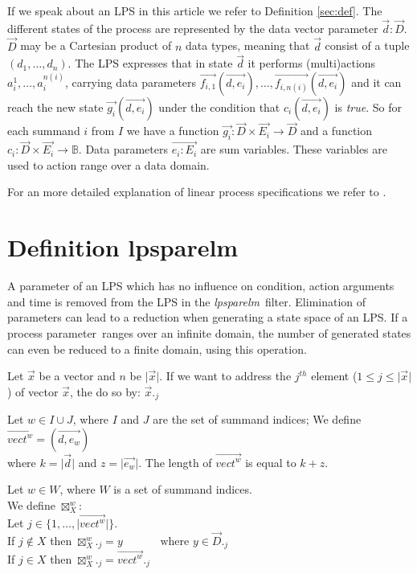 \documentclass[a4paper,10pt]{article}
\theoremstyle{plain}
\theoremstyle{definition}
\newcommand{\lps}{linear process specification}
\newcommand{\tool}{\textit{lpsparelm}}
\newcommand{\ti}{\textit}
\newcommand{\ovr}{\overrightarrow}
\newcommand{\pp}{process parameter}
\begin{document}
If we speak about an LPS in this article we refer to Definition \ref{sec:def}.  The different states 
of the process are represented by the data vector parameter $\ovr{d}:\ovr{D}$. $\ovr{D}$ may be a Cartesian product of $n$ data types, meaning that $\ovr{d}$ consist of a tuple $(d_1, \ldots, d_n)$. The LPS expresses that in state $\ovr{d}$ it performs (multi)actions $a_i^1, \ldots , a_i^{n(i)}$, carrying data parameters $\ovr{f_{i,1}}(\ovr{d,e_i}), \ldots , \ovr{f_{i,n(i)}}(\ovr{d, e_i})$ and 
it can reach the new state $\ovr{g_i}(\ovr{d ,e_i})$ under the condition that $c_i(\ovr{d , e_i})$ is \ti{true}. So for each summand $i$ from $I$ we have a function $\ovr{g_i}: \ovr{D} \times \ovr{E_i} \rightarrow \ovr{D}$ and a function $c_i: \ovr{D} \times \ovr{E_i} \rightarrow \mathbb{B}$.
Data parameters $\ovr{e_i : E_i}$ are sum variables. These variables are used to action range over a data domain. 

For an more detailed explanation of \lps s  we refer to \cite{LPS_info}.

\section{Definition lpsparelm}
A parameter of an LPS which has no influence on condition, action arguments and time is removed from the LPS in the \tool\ filter. Elimination of parameters can lead to a reduction when generating a state space of an LPS. If a \pp\ ranges over an infinite domain, the number of generated states can even be reduced to a finite domain, using this operation. %

\begin{defn}
Let $\ovr{x}$ be a vector and  $n$ be $\vert \ovr{x} \vert$. If we want to address the $j^{th}$ element ($ 1 \leq j \leq \vert \ovr{x} \vert $) of vector $\ovr{x}$, the do so by:
$\ovr{x}._j$
\end{defn}

\begin{defn}
Let $w \in I \cup J$, where $I$ and $J$ are the set of summand indices; We define \\
 $\ovr{vect^w} = (\ovr{d , e_w})$\\
where $k = \vert \ovr{d} \vert$ and $z = \vert \ovr{e_w} \vert$. The length of $ \ovr{vect^w}$ is equal to $k + z$.
\end{defn}

\begin{defn}[$\boxtimes^w_X$]
Let $w \in W$, where $W$ is a set of summand indices.\\
We define $\boxtimes^w_X$:\\
Let $j \in \lbrace 1, \dots, \vert \ovr{vect^w} \vert \rbrace.$\\
If $j \not\in X$ then $\boxtimes^w_X._j = y \hspace{40pt} \text{where }y \in \ovr{D}._j$ \\
If $j \in X$ then $\boxtimes^w_X._j = \ovr{vect^w}._j$ \\
\end{defn}
\end{document}

